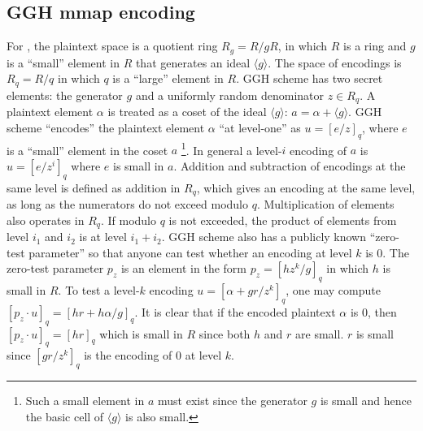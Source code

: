 \documentclass[10pt]{article}
\theoremstyle{plain}
\theoremstyle{definition}
\theoremstyle{remark}
\newcommand{\angles}[1]{\langle #1 \rangle}
\begin{document}
\subsection{GGH mmap encoding}
For \cite{GGH13a}, the plaintext space is a quotient ring $R_g = R/gR$, in which $R$ is a ring and $g$ is a ``small'' element in $R$ that generates an ideal $\angles{g}$. The space of encodings is $R_q = R/q$ in which $q$ is a ``large'' element in $R$. GGH scheme has two secret elements: the generator $g$ and a uniformly random denominator $z \in R_q$. A plaintext element $\alpha$ is treated as a coset of the ideal $\angles{g}$: $a = \alpha + \angles{g}$. GGH scheme ``encodes'' the plaintext element $\alpha$ ``at level-one'' as $u = [e/z]_q$, where $e$ is a ``small'' element in the coset $a$ \footnote{Such a small element in $a$ must exist since the generator $g$ is small and hence the basic cell of $\angles{g}$ is also small.}. In general a level-$i$ encoding of $a$ is $u = [e/z^i]_q$ where $e$ is small in $a$. Addition and subtraction of encodings at the same level is defined as addition in $R_q$, which gives an encoding at the same level, as long as the numerators do not exceed modulo $q$. Multiplication of elements also operates in $R_q$. If modulo $q$ is not exceeded, the product of elements from level $i_1$ and $i_2$ is at level $i_1 + i_2$.
GGH scheme also has a publicly known ``zero-test parameter'' so that anyone can test whether an encoding at level $k$ is 0. The zero-test parameter $p_z$ is an element in the form $p_z = [hz^k/g]_q$ in which $h$ is small in $R$. To test a level-$k$ encoding $u = [\alpha+gr/z^k]_q$, one may compute $[p_z \cdot u]_q = [hr+h\alpha/g]_q$. It is clear that if the encoded plaintext $\alpha$ is 0, then $[p_z \cdot u]_q = [hr]_q$ which is small in $R$ since both $h$ and $r$ are small. $r$ is small since $[gr/z^k]_q$ is the encoding of 0 at level $k$.
\end{document}
